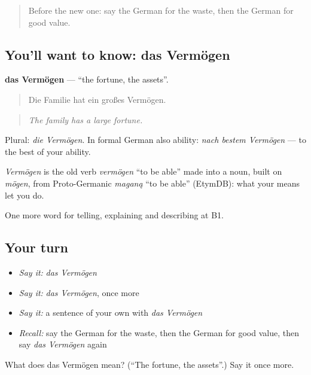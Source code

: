 \begin{quote}
Before the new one: say the German for the waste, then the German for good value.
\end{quote}

\subsection*{You'll want to know: das Vermögen}
\textbf{das Vermögen} — \textquotedblleft{}the fortune, the assets\textquotedblright{}.

\begin{quote}
Die Familie hat ein großes Vermögen.
\end{quote}

\begin{quote}
\emph{The family has a large fortune.}
\end{quote}

Plural: \emph{die Vermögen}. In formal German also ability: \emph{nach bestem Vermögen} — to the best of your ability.

\begin{cousinweb}
\emph{Vermögen} is the old verb \emph{vermögen} \textquotedblleft{}to be able\textquotedblright{} made into a noun, built on \emph{mögen}, from Proto-Germanic \emph{maganą} \textquotedblleft{}to be able\textquotedblright{} (EtymDB): what your means let you do.
\end{cousinweb}

\begin{grammarlens}[title={What you've built}]
One more word for telling, explaining and describing at B1.
\end{grammarlens}

\subsection*{Your turn}
\begin{itemize}
\raggedright
  \item \emph{Say it:} \emph{das Vermögen}
  \item \emph{Say it:} \emph{das Vermögen}, once more
  \item \emph{Say it:} a sentence of your own with \emph{das Vermögen}
  \item \emph{Recall:} say the German for the waste, then the German for good value, then say \emph{das Vermögen} again
\end{itemize}

\begin{tcolorbox}[breakable,colback=teal!4,colframe=teal!35!black,title={Before you move on}]
What does das Vermögen mean? (\textquotedblleft{}The fortune, the assets\textquotedblright{}.) Say it once more.
\end{tcolorbox}
